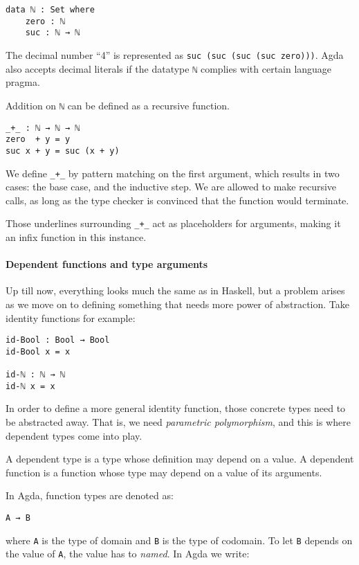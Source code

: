 \documentclass[\main/thesis.tex]{subfiles}
\begin{document}
\begin{lstlisting}
data ℕ : Set where
    zero : ℕ
    suc : ℕ → ℕ
\end{lstlisting}

The decimal number ``4'' is represented as {\lstinline|suc (suc (suc (suc zero)))|}.
Agda also accepts decimal literals if the datatype {\lstinline|ℕ|} complies with
certain language pragma.

Addition on {\lstinline|ℕ|} can be defined as a recursive function.

\begin{lstlisting}
_+_ : ℕ → ℕ → ℕ
zero  + y = y
suc x + y = suc (x + y)
\end{lstlisting}

We define {\lstinline|_+_|} by pattern matching on the first argument, which results
in two cases: the base case, and the inductive step. We are allowed to make
recursive calls, as long as the type checker is convinced that the function
would terminate.

Those underlines surrounding {\lstinline|_+_|} act as placeholders for arguments, making
it an infix function in this instance.

\paragraph{Dependent functions and type arguments}

Up till now, everything looks much the same as in Haskell, but a problem arises as
we move on to defining something that needs more power of abstraction. Take identity
functions for example:

\begin{lstlisting}
id-Bool : Bool → Bool
id-Bool x = x

id-ℕ : ℕ → ℕ
id-ℕ x = x
\end{lstlisting}

In order to define a more general identity function, those concrete types need
to be abstracted away. That is, we need \textit{parametric polymorphism}, and this is
where dependent types come into play.

A dependent type is a type whose definition may depend on a value. A dependent
function is a function whose type may depend on a value of its arguments.

In Agda, function types are denoted as:

\begin{lstlisting}
A → B
\end{lstlisting}
%
where {\lstinline|A|} is the type of domain and {\lstinline|B|} is the type of
codomain. To let {\lstinline|B|} depends on the value of {\lstinline|A|}, the
value has to \textit{named}. In Agda we write:
\end{document}

